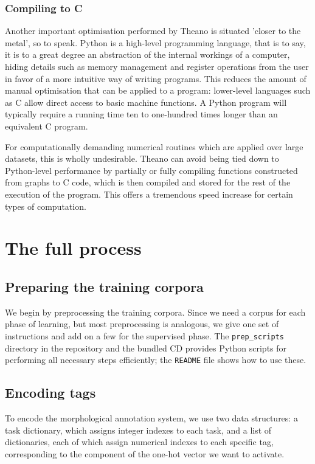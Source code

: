 \subsubsection{Compiling to C}
\label{sec:graph}
Another important optimisation performed by Theano is situated 'closer
to the metal', so to speak. Python is a high-level programming
language, that is to say, it is to a great degree an abstraction of
the internal workings of a computer, hiding details such as memory
management and register operations from the user in favor of a more
intuitive way of writing programs. This reduces the amount of manual
optimisation that can be applied to a program: lower-level languages
such as C allow direct access to basic machine functions. A Python
program will typically require a running time ten to one-hundred times
longer than an equivalent C program.

For computationally demanding numerical routines which are applied
over large datasets, this is wholly undesirable. Theano can avoid
being tied down to Python-level performance by partially or fully
compiling functions constructed from graphs to C code, which is then
compiled and stored for the rest of the execution of the
program. This offers a tremendous speed increase for certain types of
computation.

\section{The full process}
\label{sec:process}
\subsection{Preparing the training corpora}
\label{sec:trainingcorpora}
We begin by preprocessing the training corpora. Since we need a corpus
for each phase of learning, but most preprocessing is analogous, we
give one set of instructions and add on a few for the supervised
phase. The \texttt{prep\_scripts} directory in the repository and the
bundled CD provides Python scripts for performing all necessary steps
efficiently; the \texttt{README} file shows how to use these.


\subsection{Encoding tags}
\label{sec:tagencoding}

To encode the morphological annotation system, we use two data
structures: a task dictionary, which assigns integer indexes to each
task, and a list of dictionaries, each of which assign numerical
indexes to each specific tag, corresponding to the component of the
one-hot vector we want to activate.

